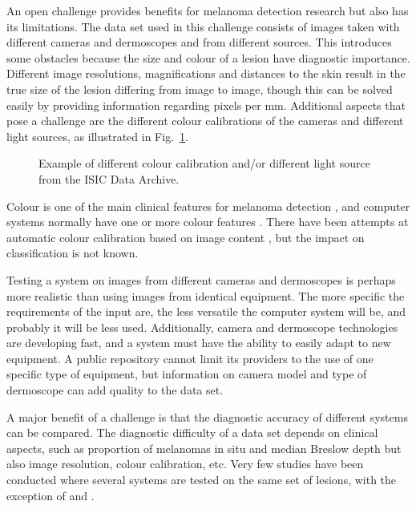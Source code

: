 \documentclass[a4paper,12pt]{article}
\begin{document}
An open challenge provides benefits for melanoma detection research but also has its limitations. The data set used in this challenge consists of images taken with different cameras and dermoscopes and from different sources. This  introduces some obstacles because the size and colour of a lesion have diagnostic importance. Different image resolutions, magnifications and distances to the skin result in the true size of the lesion differing from image to image, though this can be solved easily by providing information regarding pixels per mm. Additional aspects that pose a challenge are the different colour calibrations of the cameras and different light sources, as illustrated in  Fig.~\ref{fig:Colour}. 
  \begin{figure}[h!]
  \centering
        \caption{Example of different colour calibration and/or different light source from the ISIC Data Archive.}
        \label{fig:Colour}
   \end{figure}
Colour is one of the main clinical features for melanoma detection \citep{Argenziano2003Dermoscopy}, and computer systems normally have one or more colour features \citep{Korotkov2012Computerized}. There have been attempts at automatic colour calibration based on image content \citep{Iyatomi2011Automated}, but the impact on classification is not known. 

Testing a system on images from different cameras and dermoscopes is perhaps more realistic than using images from identical equipment. The more specific the requirements of the input are, the less versatile the computer system will be, and probably it will be less used. Additionally, camera and dermoscope technologies are developing fast, and a system must have the ability to easily adapt to new equipment. A public repository cannot limit its providers to the use of one specific type of equipment, but information on camera model and type of dermoscope can add quality to the data set.   

A major benefit of a challenge is that the diagnostic accuracy of different systems can be compared. The diagnostic difficulty of a data set depends on clinical aspects, such as proportion of melanomas in situ and median Breslow depth but also image resolution, colour calibration, etc. Very few studies have been conducted where several systems are tested on the same set of lesions, with the exception of \cite{Perrinaud2007Can} and \cite{Mollersen2015Computeraided}. 
 
\end{document}
